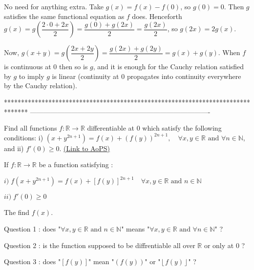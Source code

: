 \begin{solution}
	No need for anything extra. Take $g(x) = f(x) - f(0)$, so $g(0) = 0$. Then $g$ satisfies the same functional equation as $f$ does. Henceforth $g(x) = g\left( \dfrac {2\cdot 0 + 2x} {2}\right ) = \dfrac {g(0) + g(2x)} {2} = \dfrac {g(2x)} {2}$, so $g(2x) = 2g(x)$.

Now, $g(x+y) = g\left( \dfrac {2x + 2y} {2}\right ) = \dfrac {g(2x) + g(2y)} {2} = g(x) + g(y)$. When $f$ is continuous at $0$ then so is $g$, and it is enough for the Cauchy relation satisfied by $g$ to imply $g$ is linear (continuity at $0$ propagates into continuity everywhere by the Cauchy relation).
\end{solution}
*******************************************************************************
-------------------------------------------------------------------------------

\begin{problem}
	Find all functions $f:\mathbb{R} \to \mathbb{R}$ differentiable at $0$ which satisfy the following conditions:
i) $(x+y^{2n+1})=f(x)+(f(y))^{2n+1}, \quad \forall x,y \in \mathbb{R} \text{ and }  \forall n \in \mathbb{N}$, and
ii) $f'(0) \ge 0$.
	\flushright \href{https://artofproblemsolving.com/community/c6h407378}{(Link to AoPS)}
\end{problem}



\begin{solution}
	\begin{tcolorbox}If $f:\mathbb{R} \to \mathbb{R}$ be a function satisfying :

$i)\; f(x+y^{2n+1})=f(x)+[f(y)]^{2n+1} \quad \forall x,y \in \mathbb{R} \text{ and } n \in \mathbb{N}$

$ii)\; f'(0) \ge 0$

The find $f(x)$.\end{tcolorbox}
Question 1 : does "$\forall x,y \in \mathbb{R} \text{ and } n \in \mathbb{N}$" means "$\forall x,y \in \mathbb{R} \text{ and } \forall n \in \mathbb{N}$" ?

Question 2 : is the function supposed to be diffrentiable all over $\mathbb R$ or only at $0$ ?

Question 3 : does "$[f(y)]$" mean "$(f(y))$" or "$\left\lfloor f(y)\right\rfloor$" ?
\end{solution}



